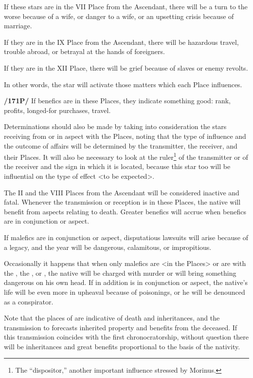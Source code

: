If these stars are in the VII Place from the Ascendant, there will be a turn to the worse because of a wife, or danger to a wife, or an upsetting crisis because of marriage. 

If they are in the IX Place from the Ascendant, there will be hazardous travel, trouble abroad, or betrayal at the hands of foreigners. 

If they are in the XII Place, there will be grief because
of slaves or enemy revolts. 

In other words, the star will activate those matters which each Place influences.

\textbf{/171P/} If benefics are in these Places, they indicate something good: rank, profits, longed-for purchases, travel.

Determinations should also be made by taking into consideration the stars receiving from or in aspect with the Places, noting that the type of influence and the outcome of affairs will be determined by the transmitter, the receiver, and their Places.
It will also be necessary to look at the ruler\footnote{The ``dispositor,'' another important influence stressed by Morinus.} of the transmitter or of the receiver and the sign in which it is located, because this star too will be influential on the type of effect <to be expected>. 

The II and the VIII Places from the Ascendant will be considered inactive and fatal. Whenever the transmission or
reception is in these Places, the native will benefit from aspects relating to death. Greater benefics will accrue when benefics are in conjunction or aspect. 

If malefics are in conjunction or aspect, disputatious lawsuits will arise because of a legacy, and the year will be dangerous, calamitous, or impropitious.

Occasionally it happens that when only malefics are <in the Places> or are with the \Sun, the \Moon, or \Mercury, the native will be charged with murder or will bring something dangerous on his own head. If in addition \Venus\xspace is in conjunction or aspect, the native’s life will be even more in upheaval because of poisonings, or he will be denounced as a conspirator. 

Note that the places of \Saturn\xspace are indicative of death and inheritances, and the transmission to \Jupiter\xspace forecasts inherited property and benefits from the deceased.
If this transmission coincides with the first chronocratorship, without question there will be inheritances and great benefits proportional to the basis of the nativity. 

